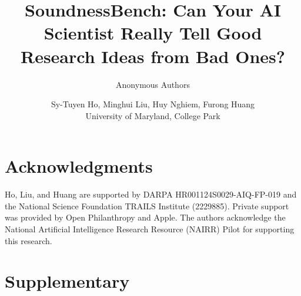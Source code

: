 \documentclass[11pt,letterpaper]{include/mystyle}
\title{SoundnessBench: Can Your AI Scientist Really Tell Good Research {Ideas} from Bad {Ones}?}
\author{Anonymous Authors}
\author{%
  Sy-Tuyen Ho, Minghui Liu, Huy Nghiem, Furong Huang \\
  University of Maryland, College Park\\
}
\begin{document}
\begin{abstract}

\end{abstract}

\maketitle







\section*{Acknowledgments}

Ho, Liu, and Huang are supported by DARPA HR001124S0029-AIQ-FP-019 and the National Science Foundation TRAILS Institute (2229885). Private support was provided by Open Philanthropy and Apple. The authors acknowledge the National Artificial Intelligence Research Resource (NAIRR) Pilot for supporting this research.




\newpage
\appendix


\onecolumn
\section*{Supplementary}



\end{document}
